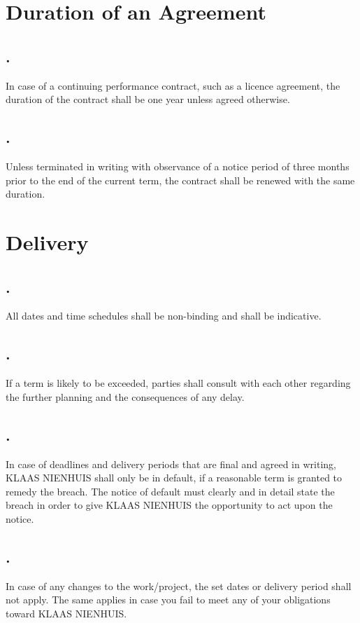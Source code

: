 \documentclass[letterpaper,10pt,english]{sphinxmanual}
\begin{document}
\chapter{Duration of an Agreement}
\label{Duration::doc}\label{Duration:duration-of-an-agreement}

\section{.}
\label{Duration:id1}
In case of a continuing performance contract, such as a licence agreement, the duration of the contract shall be one year unless agreed otherwise.


\section{.}
\label{Duration:id2}
Unless terminated in writing with observance of a notice period of three months prior to the end of the current term, the contract shall be renewed with the same duration.


\chapter{Delivery}
\label{Delivery:delivery}\label{Delivery::doc}

\section{.}
\label{Delivery:id1}
All dates and time schedules shall be non-binding and shall be indicative.


\section{.}
\label{Delivery:id2}
If a term is likely to be exceeded, parties shall consult with each other regarding the  further planning and the consequences of any delay.


\section{.}
\label{Delivery:id3}
In case of deadlines and delivery periods that are final and agreed in writing, KLAAS NIENHUIS shall only be in default, if a reasonable term is granted to remedy the breach. The notice of default
must clearly and in detail state the breach in order to give KLAAS NIENHUIS the opportunity to act upon the notice.


\section{.}
\label{Delivery:id4}
In case of any changes to the work/project, the set dates or delivery period shall not apply. The same applies in case you fail to meet any of your obligations toward KLAAS NIENHUIS.
\end{document}
